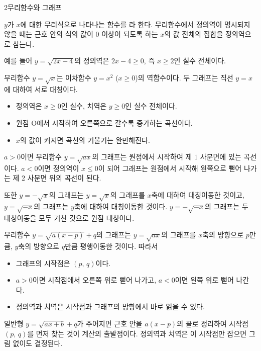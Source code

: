 \documentclass[10pt]{article}
\begin{document}
\begin{dmconcept}{2}{무리함수와 그래프}
\setlength{\parskip}{1.8mm plus 1.9mm minus 0mm}\linespread{1.27}\selectfont%


$y$가 $x$에 대한 무리식으로 나타나는 함수를 라 한다. 무리함수에서 정의역이 명시되지 않을 때는 근호 안의 식의 값이 $0$ 이상이 되도록 하는 $x$의 값 전체의 집합을 정의역으로 삼는다.

예를 들어 $y = \sqrt{2x - 4}$의 정의역은 $2x - 4 \ge 0$, 즉 $x \ge 2$인 실수 전체이다.


무리함수 $y = \sqrt{x}$는 이차함수 $y = x^{2}$ ($x \ge 0$)의 역함수이다. 두 그래프는 직선 $y = x$에 대하여 서로 대칭이다.
\begin{itemize}[leftmargin=8mm, itemsep=0.5mm, topsep=1mm]
  \item 정의역은 $x \ge 0$인 실수, 치역은 $y \ge 0$인 실수 전체이다.
  \item 원점 $\mathrm{O}$에서 시작하여 오른쪽으로 갈수록 증가하는 곡선이다.
  \item $x$의 값이 커지면 곡선의 기울기는 완만해진다.
\end{itemize}


$a > 0$이면 무리함수 $y = \sqrt{ax}$의 그래프는 원점에서 시작하여 제 $1$ 사분면에 있는 곡선이다. $a < 0$이면 정의역이 $x \le 0$이 되어 그래프는 원점에서 시작해 왼쪽으로 뻗어 나가는 제 $2$ 사분면 위의 곡선이 된다.

또한 $y = -\sqrt{x}$의 그래프는 $y = \sqrt{x}$의 그래프를 $x$축에 대하여 대칭이동한 것이고, $y = \sqrt{-x}$의 그래프는 $y$축에 대하여 대칭이동한 것이다. $y = -\sqrt{-x}$의 그래프는 두 대칭이동을 모두 거친 것으로 원점 대칭이다.


무리함수 $y = \sqrt{a(x - p)} + q$의 그래프는 $y = \sqrt{ax}$의 그래프를 $x$축의 방향으로 $p$만큼, $y$축의 방향으로 $q$만큼 평행이동한 것이다. 따라서
\begin{itemize}[leftmargin=8mm, itemsep=0.5mm, topsep=1mm]
  \item 그래프의 시작점은 $(p,\, q)$이다.
  \item $a > 0$이면 시작점에서 오른쪽 위로 뻗어 나가고, $a < 0$이면 왼쪽 위로 뻗어 나간다.
  \item 정의역과 치역은 시작점과 그래프의 방향에서 바로 읽을 수 있다.
\end{itemize}

\begin{dmnote}
일반형 $y = \sqrt{ax + b} + q$가 주어지면 근호 안을 $a(x - p)$의 꼴로 정리하여 시작점 $(p,\, q)$를 먼저 찾는 것이 계산의 출발점이다. 정의역과 치역은 이 시작점만 잡으면 그림 없이도 결정된다.
\end{dmnote}

\end{dmconcept}
\end{document}
